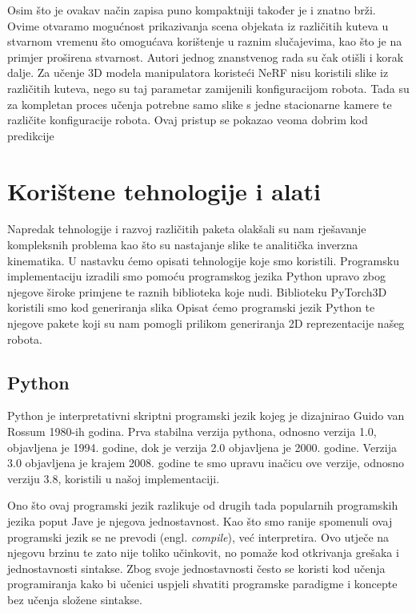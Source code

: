 \documentclass[times, utf8, diplomskirad]{fer}
\begin{document}
Osim što je ovakav način zapisa puno kompaktniji također je i znatno brži.
Ovime otvaramo mogućnost prikazivanja scena objekata iz različitih kuteva u stvarnom vremenu što omogućava korištenje u raznim slučajevima, kao što je na primjer proširena stvarnost.
Autori jednog znanstvenog rada\cite{nerfSelfModelling} su čak otišli i korak dalje.
Za učenje 3D modela manipulatora koristeći NeRF nisu koristili slike iz različitih kuteva, nego su taj parametar zamijenili konfiguracijom robota.
Tada su za kompletan proces učenja potrebne samo slike s jedne stacionarne kamere te različite konfiguracije robota.
Ovaj pristup se pokazao veoma dobrim kod predikcije

\chapter{Korištene tehnologije i alati}
Napredak tehnologije i razvoj različitih paketa olakšali su nam rješavanje kompleksnih problema kao što su nastajanje slike te analitička inverzna kinematika.
U nastavku ćemo opisati tehnologije koje smo koristili.
Programsku implementaciju izradili smo pomoću programskog jezika Python upravo zbog njegove široke primjene te raznih biblioteka koje nudi.
Biblioteku PyTorch3D koristili smo kod generiranja slika
Opisat ćemo programski jezik Python te njegove pakete koji su nam pomogli prilikom generiranja 2D reprezentacije našeg robota.

\section{Python}
Python je interpretativni skriptni programski jezik kojeg je dizajnirao Guido van Rossum 1980-ih godina.
Prva stabilna verzija pythona, odnosno verzija 1.0, objavljena je 1994. godine, dok je verzija 2.0 objavljena je 2000. godine.
Verzija 3.0 objavljena je krajem 2008. godine te smo upravu inačicu ove verzije, odnosno verziju 3.8, koristili u našoj implementaciji.

Ono što ovaj programski jezik razlikuje od drugih tada popularnih programskih jezika poput Jave je njegova jednostavnost.
Kao što smo ranije spomenuli ovaj programski jezik se ne prevodi (engl. \textit{compile}), već interpretira.
Ovo utječe na njegovu brzinu te zato nije toliko učinkovit, no pomaže kod otkrivanja grešaka i jednostavnosti sintakse.
Zbog svoje jednostavnosti često se koristi kod učenja programiranja kako bi učenici uspjeli shvatiti programske paradigme i koncepte bez učenja složene sintakse.
\end{document}
